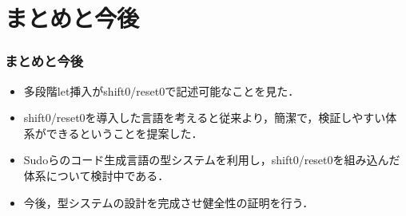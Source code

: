 \documentclass[dvipdfmx,cjk,xcolor=dvipsnames,envcountsect,notheorems,12pt,handout]{beamer} \usepackage{pgfpages} \pgfpagesuselayout{4 on 1}[a4paper,landscape,border shrink=5mm]
\theoremstyle{definition}
\begin{document}







\section{まとめと今後}

\begin{frame}
  \frametitle{まとめと今後}
  \begin{itemize}
  \item 多段階let挿入がshift0/reset0で記述可能なことを見た．
  \item[] shift0/reset0を導入した言語を考えると従来より，簡潔で，検証しやすい体系ができるということを提案した．
  \item Sudoらのコード生成言語の型システムを利用し，shift0/reset0を組み込んだ体系について検討中である．
  \item 今後，型システムの設計を完成させ健全性の証明を行う．%
  \end{itemize}
\end{frame}


\end{document}
